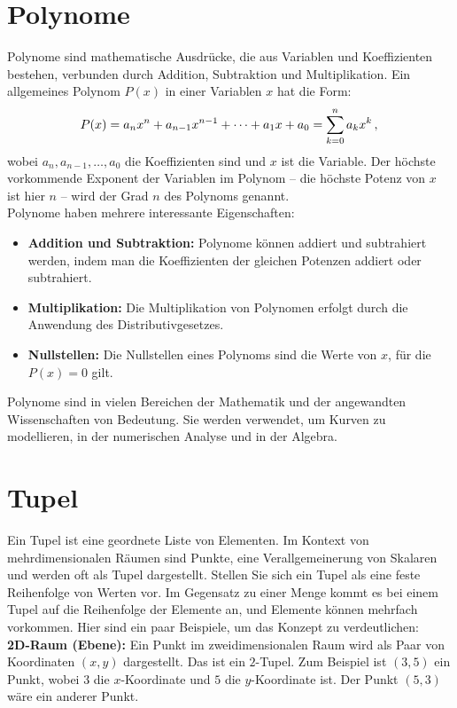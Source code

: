\section{Polynome}\label{sec: Polynome}
Polynome sind mathematische Ausdrücke, die aus Variablen und Koeffizienten bestehen, verbunden durch Addition, Subtraktion und Multiplikation. Ein allgemeines Polynom $P(x)$ in einer Variablen $x$ hat die Form:
\begin{equation}
P(x) = a_n x^n + a_{n-1} x^{n-1} + \cdots + a_1 x + a_0 = \sum_{k=0}^{n} a_k x^k \,{,}\,
\end{equation}
wobei $a_n, a_{n-1}, \ldots, a_0$ die Koeffizienten sind und $x$ ist die Variable. Der höchste vorkommende Exponent der Variablen im Polynom -- die höchste Potenz von $x$ ist hier $n$ -- wird der Grad $n$ des Polynoms genannt. \\

Polynome haben mehrere interessante Eigenschaften:
\begin{itemize}
    \item \textbf{Addition und Subtraktion:} Polynome können addiert und subtrahiert werden, indem man die Koeffizienten der gleichen Potenzen addiert oder subtrahiert.
    \item \textbf{Multiplikation:} Die Multiplikation von Polynomen erfolgt durch die Anwendung des Distributivgesetzes.
    \item \textbf{Nullstellen:} Die Nullstellen eines Polynoms sind die Werte von $x$, für die $P(x) = 0$ gilt.
\end{itemize}
Polynome sind in vielen Bereichen der Mathematik und der angewandten Wissenschaften von Bedeutung. Sie werden verwendet, um Kurven zu modellieren, in der numerischen Analyse und in der Algebra.

\section{Tupel}\label{sec: Tupel}
Ein Tupel ist eine geordnete Liste von Elementen. Im Kontext von mehrdimensionalen Räumen sind Punkte, eine Verallgemeinerung von Skalaren und werden oft als Tupel dargestellt. Stellen Sie sich ein Tupel als eine feste Reihenfolge von Werten vor. Im Gegensatz zu einer Menge kommt es bei einem Tupel auf die Reihenfolge der Elemente an, und Elemente können mehrfach vorkommen. Hier sind ein paar Beispiele, um das Konzept zu verdeutlichen:\\

\noindent\textbf{2D-Raum (Ebene):} Ein Punkt im zweidimensionalen Raum wird als Paar von Koordinaten $(x,y)$ dargestellt. Das ist ein $2$-Tupel. Zum Beispiel ist $(3,5)$ ein Punkt, wobei $3$ die $x$-Koordinate und $5$ die $y$-Koordinate ist. Der Punkt $(5,3)$ wäre ein anderer Punkt. \\

